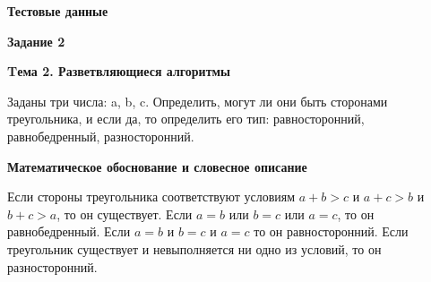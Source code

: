 \documentclass[12pt, a4paper]{article}
\begin{document}
\begin{flushleft}
		{\newpage \textbf{Тестовые данные}\par

		}
		\newpage
	\end{flushleft}

	\begin{flushleft}
		{\textbf{Задание 2}}\par
		{\textbf{Tема 2. Разветвляющиеся алгоритмы}}\par
		{Заданы три числа: a, b, c. Определить, могут ли они быть сторонами
		треугольника, и если да, то определить его тип:
		равносторонний,	равнобедренный, разносторонний.}\par
		{\textbf{Математическое обоснование и словесное описание}\par
		Если стороны треугольника соответствуют условиям $a+b>c$ и $a+c>b$ и $b+c>a$,
		то он существует. Если $a=b$ или $b=c$ или $a=c$, то он равнобедренный.
		Если $a=b$ и $b=c$ и $a=c$ то он равносторонний. Если треугольник существует и
		невыполняется ни одно из условий, то он разносторонний.}\par


\end{flushleft}
\end{document}

